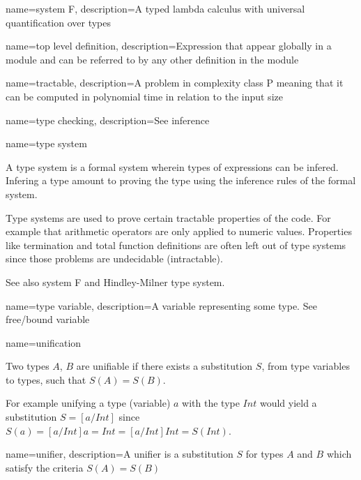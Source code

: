 { name={system F},
  description={A typed lambda calculus with universal quantification over types}
}

{ name={top level definition},
  description={Expression that appear globally in a module and can be referred to by any other definition in the module}
}

{ name={tractable},
  description={A problem in complexity class P meaning that it can be computed in polynomial time in relation to the input size}
}

{ name={type checking},
  description={See inference}
}

{ name={type system} }
{A type system is a formal system wherein types of expressions can be infered. Infering a type amount to proving the type using the inference rules of the formal system.

Type systems are used to prove certain tractable properties of the code. For example that arithmetic operators are only applied to numeric values. Properties like termination and total function definitions are often left out of type systems since those problems are undecidable (intractable).

See also system F and Hindley-Milner type system.
}

{ name={type variable},
  description={A variable representing some type. See free/bound variable}
}

{ name={unification} }
{Two types $A$, $B$ are unifiable if there exists a substitution $S$, from type variables to types, such that $S(A) = S(B)$.

For example unifying a type (variable) $a$ with the type $Int$ would yield a substitution $S = [a/Int]$ since $S(a) = [a/Int]a = Int = [a/Int]Int = S(Int)$.
}

{ name={unifier},
  description={A unifier is a substitution $S$ for types $A$ and $B$ which satisfy the criteria $S(A) = S(B)$}
}


